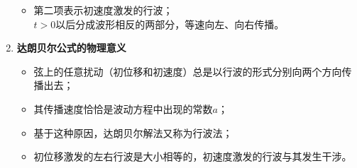 \begin{enumerate}[1.]
\begin{itemize}
		\item 第二项表示初速度激发的行波；\\
		\hspace*{2em} $t > 0$以后分成波形相反的两部分，等速向左、向右传播。
	\end{itemize}
	\vspace*{1em}

	\item \textbf{达朗贝尔公式的物理意义}
	\begin{itemize}
		\item 弦上的任意扰动（初位移和初速度）总是以行波的形式分别向两个方向传播出去；
		\item 其传播速度恰恰是波动方程中出现的常数$a$；
		\item 基于这种原因，达朗贝尔解法又称为行波法；
		\item 初位移激发的左右行波是大小相等的，初速度激发的行波与其发生干涉。
	\end{itemize}
\end{enumerate}


